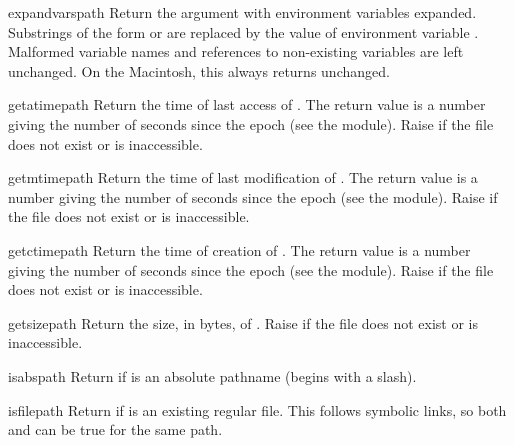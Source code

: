 \begin{funcdesc}{expandvars}{path}
Return the argument with environment variables expanded.  Substrings
of the form  or  are
replaced by the value of environment variable .  Malformed
variable names and references to non-existing variables are left
unchanged.  On the Macintosh, this always returns 
unchanged.
\end{funcdesc}

\begin{funcdesc}{getatime}{path}
Return the time of last access of .  The return
value is a number giving the number of seconds since the epoch (see the 
 module).  Raise  if the file does
not exist or is inaccessible.
\end{funcdesc}

\begin{funcdesc}{getmtime}{path}
Return the time of last modification of .  The return
value is a number giving the number of seconds since the epoch (see the 
 module).  Raise  if the file does
not exist or is inaccessible.
\end{funcdesc}

\begin{funcdesc}{getctime}{path}
Return the time of creation of .  The return
value is a number giving the number of seconds since the epoch (see the 
 module).  Raise  if the file does
not exist or is inaccessible.
\end{funcdesc}

\begin{funcdesc}{getsize}{path}
Return the size, in bytes, of .  Raise
 if the file does not exist or is inaccessible.
\end{funcdesc}

\begin{funcdesc}{isabs}{path}
Return  if  is an absolute pathname (begins with a
slash).
\end{funcdesc}

\begin{funcdesc}{isfile}{path}
Return  if  is an existing regular file.  This follows
symbolic links, so both  and 
can be true for the same path.
\end{funcdesc}

